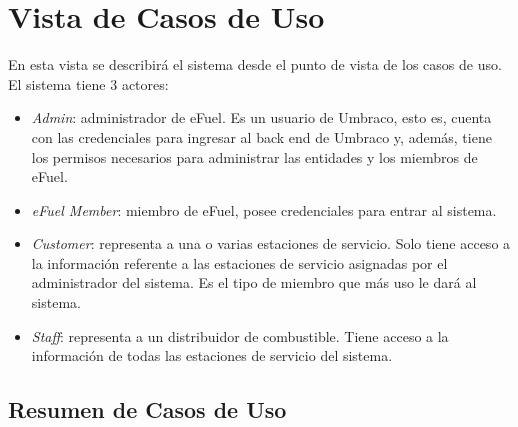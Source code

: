     \section{Vista de Casos de Uso} \label{vistaCasosDeUso}
    En esta vista se describirá el sistema desde el punto de vista de los casos de uso. El sistema tiene 3 actores:

    \begin{itemize}
        \item \emph{Admin}: administrador de eFuel. Es un usuario de Umbraco, esto es, cuenta con las credenciales para ingresar al back end de Umbraco y, además, tiene los permisos necesarios para administrar las entidades y los miembros de eFuel.
        \item \emph{eFuel Member}: miembro de eFuel, posee credenciales para entrar al sistema.
        \item \emph{Customer}: representa a una o varias estaciones de servicio. Solo tiene acceso a la información referente a las estaciones de servicio asignadas por el administrador del sistema. Es el tipo de miembro que más uso le dará al sistema.
        \item \emph{Staff}: representa a un distribuidor de combustible. Tiene acceso a la información de todas las estaciones de servicio del sistema.
    \end{itemize}

    \subsection{Resumen de Casos de Uso}
    
    \newcommand\rownumber{\stepcounter{magicrownumbers}\arabic{magicrownumbers}}

